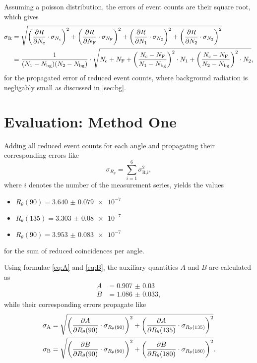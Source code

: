 Assuming a poisson distribution, the errors of event counts are their square root, which gives
\begin{align*}
	\sigma_\text{R} &= \sqrt{\left(\frac{\partial R}{\partial N_\text{c}}\cdot\sigma_{N_\text{c}}\right)^2
	+ \left(\frac{\partial R}{\partial N_\text{F}}\cdot\sigma_{N_\text{F}}\right)^2
	+ \left(\frac{\partial R}{\partial N_1}\cdot\sigma_{N_2}\right)^2
	+ \left(\frac{\partial R}{\partial N_2}\cdot\sigma_{N_2}\right)^2} \\
	&=\frac{1}{(N_1-N_\text{bg})(N_2-N_\text{bg})}
	\cdot\sqrt{N_\text{c} + N_\text{F} + \left(\frac{N_\text{c}-N_\text{F}}{N_1-N_\text{bg}}\right)^2\cdot N_1
	+ \left(\frac{N_\text{c}-N_\text{F}}{N_2-N_\text{bg}}\right)^2\cdot N_2},
\end{align*}
for the propagated error of reduced event counts, where background radiation is negligably small as discussed in \autoref{sec:bg}.

\section{Evaluation: Method One}
Adding all reduced event counts for each angle and propagating their corresponding errors like
\begin{equation*}
	\sigma_{R_\theta}=\sum_{i=1}^{6}\sigma_\text{R,i}^2,
\end{equation*}
where $i$ denotes the number of the measurement series, yields the values
\begin{itemize}
	\item $R_\theta (90)=\num{3.640(79)e-7}$
	\item $R_\theta (135)=\num{3.303(80)e-7}$
	\item $R_\theta (90)=\num{3.953(83)e-7}$
\end{itemize}
for the sum of reduced coincidences per angle.

Using formulae \ref{eq:A} and \ref{eq:B}, the auxiliary quantities $A$ and $B$ are calculated as
\begin{align*}
	A &= \num{0.907(30)} \\
	B &= \num{1.086(33)},
\end{align*}
while their corresponding errors propagate like
\begin{align}
	\sigma_\text{A} &= \sqrt{\left(\frac{\partial A}{\partial R_\theta (90)}\cdot\sigma_{R_\theta(90)}\right)^2 + \left(\frac{\partial A}{\partial R_\theta (135)}\cdot\sigma_{R_\theta(135)}\right)^2} \label{eq:err_A} \\
	\sigma_\text{B} &= \sqrt{\left(\frac{\partial B}{\partial R_\theta (90)}\cdot\sigma_{R_\theta(90)}\right)^2 + \left(\frac{\partial B}{\partial R_\theta (180)}\cdot\sigma_{R_\theta(180)}\right)^2}. \nonumber
\end{align}

